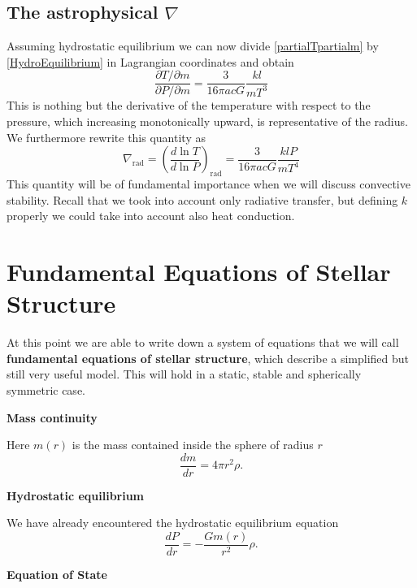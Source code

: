 \subsection{The astrophysical $\nabla$}
Assuming hydrostatic equilibrium we can now divide \ref{partialTpartialm} by \ref{HydroEquilibrium} in Lagrangian coordinates and obtain
\begin{equation}
	\frac{\partial T/\partial m}{\partial P / \partial m} = \frac{3}{16 \pi a c G} \frac{k l}{m T^3}
\end{equation}
This is nothing but the derivative of the temperature with respect to the pressure, which increasing monotonically upward, is representative of the radius. We furthermore rewrite this quantity as
\begin{equation}\label{nablarad}
	\nabla_{\mathrm{rad}} = \left( \frac{d \ln T}{d \ln P}  \right)_{\mathrm{rad}}= \frac{3}{16 \pi a c G} \frac{k l P}{m T^4}
\end{equation}
This quantity will be of fundamental importance when we will discuss convective stability. Recall that we took into account only radiative transfer, but defining $k$ properly we could take into account also heat conduction.
\section{Fundamental Equations of Stellar Structure}
At this point we are able to write down a system of equations that we will call \textbf{fundamental equations of stellar structure}, which describe a simplified but still very useful model. This will hold in a static, stable and spherically symmetric case.

\textbf{Mass continuity} 

Here $m(r)$ is the mass contained inside the sphere of radius $r$
\begin{equation}\label{masscons}
	\frac{dm}{dr}=4 \pi r^2 \rho.
\end{equation}

\textbf{Hydrostatic equilibrium} 

We have already encountered the hydrostatic equilibrium equation
\begin{equation}\label{hydroeq}
	\frac{dP}{dr}= - \frac{G m(r)}{r^2} \rho.
\end{equation}

\textbf{Equation of State} 

